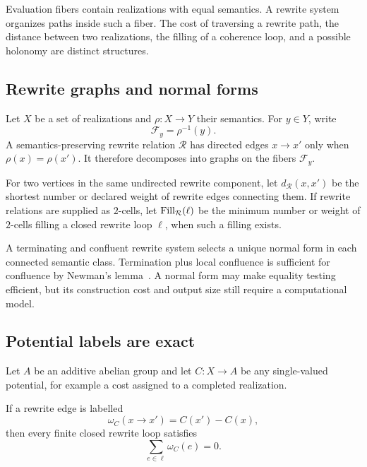 Evaluation fibers contain realizations with equal semantics.  A rewrite system
organizes paths inside such a fiber.  The cost of traversing a rewrite path,
the distance between two realizations, the filling of a coherence loop, and a
possible holonomy are distinct structures.

\subsection{Rewrite graphs and normal forms}

Let $X$ be a set of realizations and $\rho:X\to Y$ their semantics.  For
$y\in Y$, write
\[
  \mathcal F_y=\rho^{-1}(y).
\]
A semantics-preserving rewrite relation $\mathcal R$ has directed edges
$x\to x'$ only when $\rho(x)=\rho(x')$.  It therefore decomposes into graphs
on the fibers $\mathcal F_y$.

\begin{definition}
For two vertices in the same undirected rewrite component, let
$d_\mathcal R(x,x')$ be the shortest number or declared weight of rewrite
edges connecting them.  If rewrite relations are supplied as $2$-cells, let
$\operatorname{Fill}_\mathcal R(\ell)$ be the minimum number or weight of $2$-cells filling
a closed rewrite loop $\ell$, when such a filling exists.
\end{definition}

A terminating and confluent rewrite system selects a unique normal form in
each connected semantic class.  Termination plus local confluence is sufficient
for confluence by Newman's lemma~\cite{Newman1942}.  A normal form may make
equality testing efficient, but its construction cost and output size still
require a computational model.

\subsection{Potential labels are exact}

Let $A$ be an additive abelian group and let $C:X\to A$ be any single-valued
potential, for example a cost assigned to a completed realization.

\begin{proposition}
\label{prop:additive-exactness-obstruction}
If a rewrite edge is labelled
\[
  \omega_C(x\to x')=C(x')-C(x),
\]
then every finite closed rewrite loop satisfies
\[
  \sum_{e\in\ell}\omega_C(e)=0.
\]
\end{proposition}

